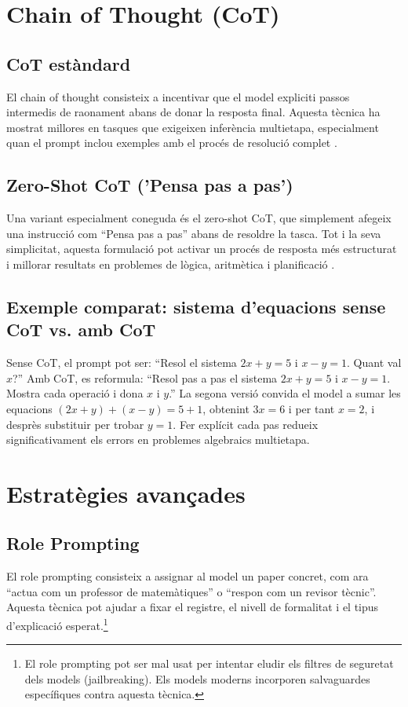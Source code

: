 \documentclass[12pt,a4paper]{report}
\begin{document}
\section{Chain of Thought (CoT)}

\subsection{CoT estàndard}
El chain of thought consisteix a incentivar que el model expliciti passos intermedis de raonament abans de donar la resposta final. Aquesta tècnica ha mostrat millores en tasques que exigeixen inferència multietapa, especialment quan el prompt inclou exemples amb el procés de resolució complet \cite{wei2022}.

\subsection{Zero-Shot CoT ('Pensa pas a pas')}
Una variant especialment coneguda és el zero-shot CoT, que simplement afegeix una instrucció com ``Pensa pas a pas'' abans de resoldre la tasca. Tot i la seva simplicitat, aquesta formulació pot activar un procés de resposta més estructurat i millorar resultats en problemes de lògica, aritmètica i planificació \cite{kojima2022}.

\subsection{Exemple comparat: sistema d'equacions sense CoT vs. amb CoT}
Sense CoT, el prompt pot ser: ``Resol el sistema \(2x + y = 5\) i \(x - y = 1\). Quant val \(x\)?'' Amb CoT, es reformula: ``Resol pas a pas el sistema \(2x + y = 5\) i \(x - y = 1\). Mostra cada operació i dona \(x\) i \(y\).'' La segona versió convida el model a sumar les equacions \((2x + y) + (x - y) = 5 + 1\), obtenint \(3x = 6\) i per tant \(x = 2\), i desprès substituir per trobar \(y = 1\). Fer explícit cada pas redueix significativament els errors en problemes algebraics multietapa.

\section{Estratègies avançades}

\subsection{Role Prompting}
El role prompting consisteix a assignar al model un paper concret, com ara ``actua com un professor de matemàtiques'' o ``respon com un revisor tècnic''. Aquesta tècnica pot ajudar a fixar el registre, el nivell de formalitat i el tipus d'explicació esperat.\footnote{El role prompting pot ser mal usat per intentar eludir els filtres de seguretat dels models (jailbreaking). Els models moderns incorporen salvaguardes específiques contra aquesta tècnica.}
\end{document}
